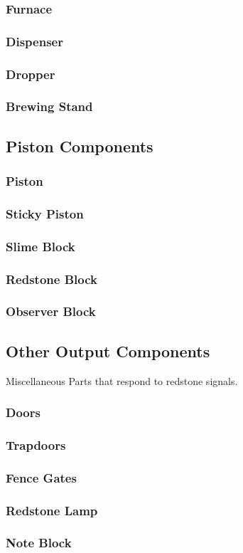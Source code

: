 \documentclass[12pt]{article}
\begin{document}
\subsubsection{Furnace}
\subsubsection{Dispenser}
\subsubsection{Dropper}
\subsubsection{Brewing Stand}

\pagebreak

\subsection{Piston Components}
\subsubsection{Piston}
\subsubsection{Sticky Piston}
\subsubsection{Slime Block}
\subsubsection{Redstone Block}
\subsubsection{Observer Block}

\pagebreak

\subsection{Other Output Components}
Miscellaneous Parts that respond to redstone signals.
\subsubsection{Doors}
\subsubsection{Trapdoors}
\subsubsection{Fence Gates}
\subsubsection{Redstone Lamp}
\subsubsection{Note Block}
\end{document}
